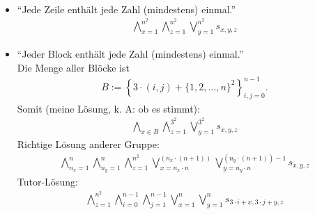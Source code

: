 \begin{aufgabe}
\begin{itemize}
\begin{align*}
		\end{align*}
		\item ``Jede Zeile enthält jede Zahl (mindestens) einmal.''
		\begin{align*}
			\bigwedge\limits_{x=1}^{n^2}\bigwedge\limits_{z=1}^{n^2}\bigvee\limits_{y=1}^{n^2} s_{x,y,z}
		\end{align*}
		\item ``Jeder Block enthält jede Zahl (mindestens) einmal.''\\
		Die Menge aller Blöcke ist
		\begin{align*}
			B:=\left\lbrace 3\cdot(i,j)+\lbrace1,2,\ldots,n\rbrace^2\right\rbrace_{i,j=0}^{n-1}.
		\end{align*}
		Somit (meine Lösung, k. A: ob es stimmt):
		\begin{align*}
			\bigwedge\limits_{x\in B}\bigwedge\limits_{z=1}^{3^2}\bigvee\limits_{y=1}^{3^2} s_{x,y,z}
		\end{align*}
		Richtige Lösung anderer Gruppe:
		\begin{align*}
			\bigwedge\limits_{n_x=1}^n\bigwedge\limits_{n_y=1}^n\bigwedge\limits_{z=1}^{n^2}\bigvee\limits_{x=n_x\cdot n}^{(n_x\cdot(n+1))}\bigvee\limits_{y=n_y\cdot n}^{(n_y\cdot(n+1))-1} s_{x,y,z}
		\end{align*}
		Tutor-Lösung:
		\begin{align*}
			\bigwedge\limits_{z=1}^{n^2}\bigwedge\limits_{i=0}^{n-1}\bigwedge\limits_{j=1}^{n-1}\bigvee\limits_{x=1}^{n}\bigvee\limits_{y=1}^n s_{3\cdot i+x,3\cdot j+y,z}
		\end{align*}
	\end{itemize}
\end{aufgabe}

